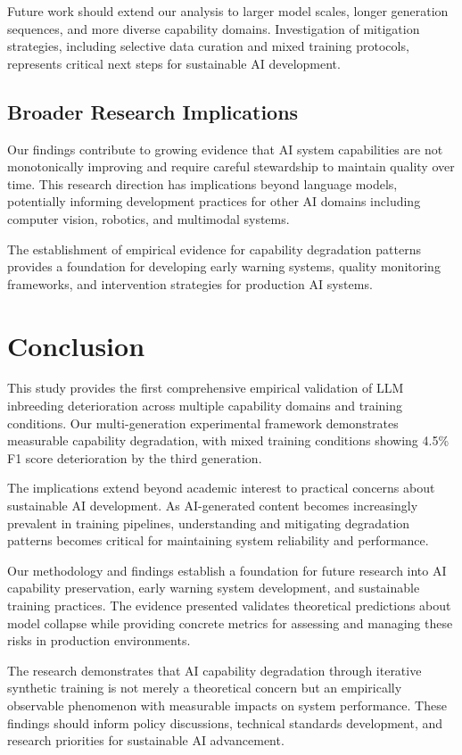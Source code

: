 \documentclass{article}
\begin{document}
Future work should extend our analysis to larger model scales, longer generation sequences, and more diverse capability domains. Investigation of mitigation strategies, including selective data curation and mixed training protocols, represents critical next steps for sustainable AI development.

\subsection{Broader Research Implications}

Our findings contribute to growing evidence that AI system capabilities are not monotonically improving and require careful stewardship to maintain quality over time. This research direction has implications beyond language models, potentially informing development practices for other AI domains including computer vision, robotics, and multimodal systems.

The establishment of empirical evidence for capability degradation patterns provides a foundation for developing early warning systems, quality monitoring frameworks, and intervention strategies for production AI systems.

\section{Conclusion}

This study provides the first comprehensive empirical validation of LLM inbreeding deterioration across multiple capability domains and training conditions. Our multi-generation experimental framework demonstrates measurable capability degradation, with mixed training conditions showing 4.5\% F1 score deterioration by the third generation.

The implications extend beyond academic interest to practical concerns about sustainable AI development. As AI-generated content becomes increasingly prevalent in training pipelines, understanding and mitigating degradation patterns becomes critical for maintaining system reliability and performance.

Our methodology and findings establish a foundation for future research into AI capability preservation, early warning system development, and sustainable training practices. The evidence presented validates theoretical predictions about model collapse while providing concrete metrics for assessing and managing these risks in production environments.

The research demonstrates that AI capability degradation through iterative synthetic training is not merely a theoretical concern but an empirically observable phenomenon with measurable impacts on system performance. These findings should inform policy discussions, technical standards development, and research priorities for sustainable AI advancement.
\end{document}
